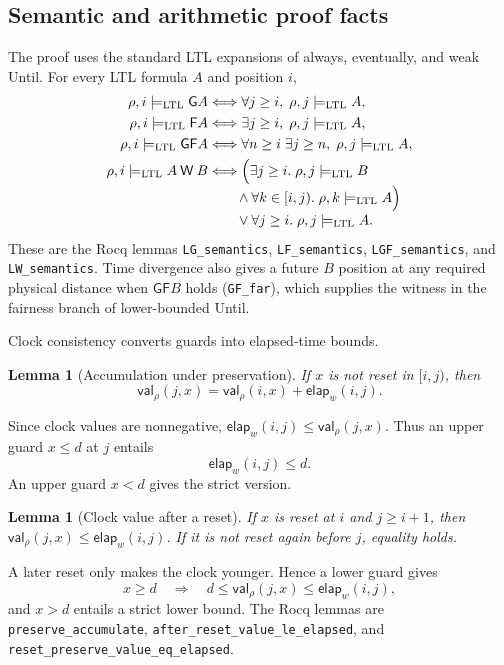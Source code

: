 \documentclass[10pt,journal,compsoc]{IEEEtran}
\newtheorem{lemma}[theorem]{Lemma}
\newcommand{\satL}{\models_{\mathrm{LTL}}}
\newcommand{\Always}{\mathsf{G}}
\newcommand{\Eventually}{\mathsf{F}}
\newcommand{\WeakUntil}{\mathbin{\mathsf{W}}}
\newcommand{\CVal}{\mathsf{val}}
\newcommand{\elapsed}{\mathsf{elap}}
\begin{document}
\subsection{Semantic and arithmetic proof facts}
\label{subsec:main-proof-facts}
The proof uses the standard LTL expansions of always, eventually, and weak
Until. For every LTL formula $A$ and position $i$,
\begin{align}
\rho,i\satL \Always A &\Longleftrightarrow
  \forall j\ge i,\;\rho,j\satL A,\nonumber\\
\rho,i\satL \Eventually A &\Longleftrightarrow
  \exists j\ge i,\;\rho,j\satL A,\nonumber\\
\rho,i\satL \Always\Eventually A &\Longleftrightarrow
  \forall n\ge i\;\exists j\ge n,\;\rho,j\satL A,\label{eq:main-sem-GF}\\
\rho,i\satL A\WeakUntil B &\Longleftrightarrow
  \Bigl(\exists j\ge i.\;\rho,j\satL B\\[-1mm]
  &\qquad\land\forall k\in[i,j).\;\rho,k\satL A\Bigr)\nonumber\\[-1mm]
  &\qquad\lor\forall j\ge i.\;\rho,j\satL A.\nonumber
\end{align}
These are the Rocq lemmas \texttt{LG\_semantics},
\texttt{LF\_semantics}, \texttt{LGF\_semantics}, and
\texttt{LW\_semantics}. Time divergence also gives a future $B$ position at
any required physical distance when $\Always\Eventually B$ holds
(\texttt{GF\_far}), which supplies the witness in the fairness branch of
lower-bounded Until.

Clock consistency converts guards into elapsed-time bounds.
\begin{lemma}[Accumulation under preservation]
\label{lem:clock-accumulation}
If $x$ is not reset in $[i,j)$, then
\[
\CVal_\rho(j,x)=\CVal_\rho(i,x)+\elapsed_w(i,j).
\]
\end{lemma}
Since clock values are nonnegative, $\elapsed_w(i,j)\le\CVal_\rho(j,x)$.
Thus an upper guard $x\le d$ at $j$ entails
\begin{equation}
\elapsed_w(i,j)\le d.
\label{eq:upper-clock}
\end{equation}
An upper guard $x<d$ gives the strict version.

\begin{lemma}[Clock value after a reset]
\label{lem:clock-after-reset}
If $x$ is reset at $i$ and $j\ge i+1$, then
$\CVal_\rho(j,x)\le\elapsed_w(i,j)$. If it is not reset again before $j$,
equality holds.
\end{lemma}
A later reset only makes the clock younger. Hence a lower guard gives
\begin{equation}
x\ge d\quad\Longrightarrow\quad
d\le\CVal_\rho(j,x)\le\elapsed_w(i,j),
\label{eq:lower-clock}
\end{equation}
and $x>d$ entails a strict lower bound. The Rocq lemmas are
\texttt{preserve\_accumulate},
\texttt{after\_reset\_value\_le\_elapsed}, and
\texttt{reset\_preserve\_value\_eq\_elapsed}.
\end{document}
